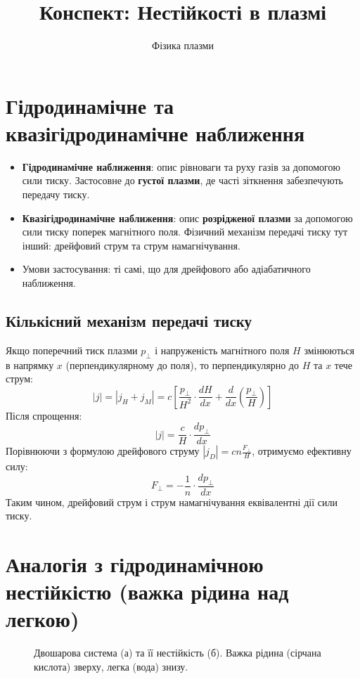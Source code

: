 \documentclass[a4paper,12pt]{article}
\title{Конспект: Нестійкості в плазмі}
\author{Фізика плазми}
\date{}
\begin{document}
\maketitle

\section{Гідродинамічне та квазігідродинамічне наближення}

\begin{itemize}
    \item \textbf{Гідродинамічне наближення}: опис рівноваги та руху газів за допомогою сили тиску. Застосовне до \textbf{густої плазми}, де часті зіткнення забезпечують передачу тиску.
    \item \textbf{Квазігідродинамічне наближення}: опис \textbf{розрідженої плазми} за допомогою сили тиску поперек магнітного поля. Фізичний механізм передачі тиску тут інший: дрейфовий струм та струм намагнічування.
    \item Умови застосування: ті самі, що для дрейфового або адіабатичного наближення.
\end{itemize}

\subsection{Кількісний механізм передачі тиску}

Якщо поперечний тиск плазми $p_{\perp}$ і напруженість магнітного поля $H$ змінюються в напрямку $x$ (перпендикулярному до поля), то перпендикулярно до $H$ та $x$ тече струм:
\[
|j| = |j_H + j_M| = c \left[ \frac{p_{\perp}}{H^2} \cdot \frac{dH}{dx} + \frac{d}{dx} \left( \frac{p_{\perp}}{H} \right) \right]
\]
Після спрощення:
\[
|j| = \frac{c}{H} \cdot \frac{dp_{\perp}}{dx}
\]
Порівнюючи з формулою дрейфового струму $|j_D| = cn \frac{F_{\perp}}{H}$, отримуємо ефективну силу:
\[
F_{\perp} = -\frac{1}{n} \cdot \frac{dp_{\perp}}{dx}
\]
Таким чином, дрейфовий струм і струм намагнічування еквівалентні дії сили тиску.

\section{Аналогія з гідродинамічною нестійкістю (важка рідина над легкою)}

\begin{figure}[h!]
    \centering
    \caption{Двошарова система (а) та її нестійкість (б). Важка рідина (сірчана кислота) зверху, легка (вода) знизу.}
    \label{fig:two_layers}
\end{figure}
\end{document}
